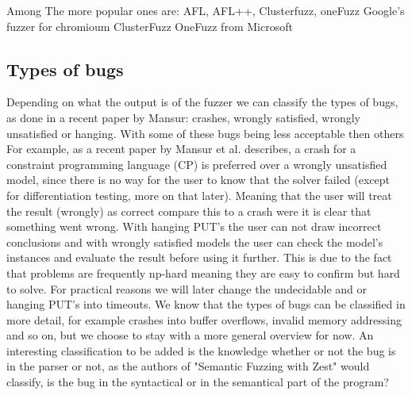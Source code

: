 Among The more popular ones are: AFL, AFL++, Clusterfuzz, oneFuzz
Google's fuzzer for chromioum ClusterFuzz
OneFuzz from Microsoft 





\subsection{Types of bugs} 
Depending on what the output is of the fuzzer we can classify the types of bugs, as done in a recent paper\cite{1mansur2020detecting} by Mansur: crashes, wrongly satisfied, wrongly unsatisfied or hanging. With some of these bugs being less acceptable then others 
For example, as a recent paper\cite{1mansur2020detecting} by Mansur et al. describes, a crash for a constraint programming language (CP) is preferred over a wrongly unsatisfied model, since there is no way for the user to know that the solver failed (except for differentiation testing, more on that later). Meaning that the user will treat the result (wrongly) as correct compare this to a crash were it is clear that something went wrong.
With hanging PUT's the user can not draw incorrect conclusions and with wrongly satisfied models the user can check the model's instances and evaluate the result before using it further. This is due to the fact that problems are frequently np-hard meaning they are easy to confirm but hard to solve. For practical reasons we will later change the undecidable and or hanging PUT's into timeouts. We know that the types of bugs can be classified in more detail, for example crashes into buffer overflows, invalid memory addressing and so on, but we choose to stay with a more general overview for now. An interesting classification to be added is the knowledge whether or not the bug is in the parser or not, as the authors of "Semantic Fuzzing with Zest"\cite{22SemanticFuzzing} would classify, is the bug in the syntactical or in the semantical part of the program?



